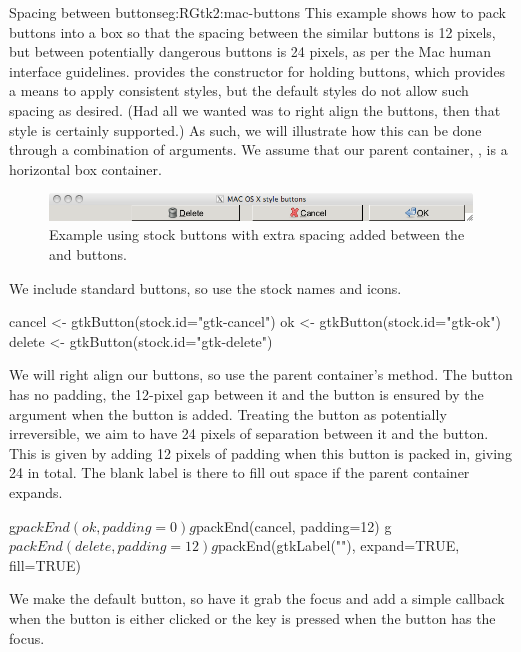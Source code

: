 \begin{example}{Spacing between buttons}{eg:RGtk2:mac-buttons}
This example shows how to pack buttons into a box so that the spacing
between the similar buttons is 12 pixels, but between potentially
dangerous buttons is 24 pixels, as per the Mac human interface
guidelines.
\GTK\/ provides the constructor  for
holding buttons, which provides a means to apply consistent styles,
but the default styles do not allow such spacing as desired. (Had all
we wanted was to right align the buttons, then that style is certainly
supported.) As such, we will illustrate how this can be done through a
combination of  arguments.
We assume that our parent container, , is a
horizontal box container.


\begin{figure}
  \centering
  \includegraphics[width=.85\textwidth]{ex-RGtk2-mac-buttons}
  \caption{Example using stock buttons with extra spacing added between the  and  buttons.}
  \label{fig:ex-RGtk2-mac-buttons}
\end{figure}

We include standard buttons, so use the stock names and icons.
\begin{Schunk}
\begin{Sinput}
 cancel <- gtkButton(stock.id="gtk-cancel")
 ok <- gtkButton(stock.id="gtk-ok")
 delete <- gtkButton(stock.id="gtk-delete")
\end{Sinput}
\end{Schunk}

We will right align our buttons, so use the parent container's
 method. The  button has no padding, the
12-pixel gap between it and the  button is ensured by  the
 argument when the  button is
added. Treating the  button as potentially irreversible,
we aim to have 24 pixels of separation between it and the
 button. This is given by adding 12 pixels of padding
when this button is packed in, giving 24 in total. The blank label is
there to fill out space if the parent container expands.
\begin{Schunk}
\begin{Sinput}
 g$packEnd(ok, padding=0)
 g$packEnd(cancel, padding=12)
 g$packEnd(delete, padding=12)
 g$packEnd(gtkLabel(""), expand=TRUE, fill=TRUE)
\end{Sinput}
\end{Schunk}
We make  the default button, so have it grab the focus and
add a simple callback when the button is either clicked or the
 key is pressed when the button has the focus.
\begin{Schunk}
\end{Schunk}







\end{example}
